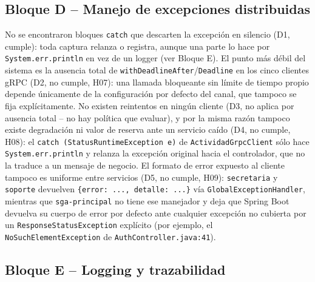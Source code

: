 \documentclass[11pt,a4paper]{article}
\begin{document}
    \subsection{Bloque D -- Manejo de excepciones distribuidas}

    No se encontraron bloques \texttt{catch} que descarten la excepci\'on en silencio (D1, cumple): toda captura relanza o registra, aunque una parte lo hace por \texttt{System.err.println} en vez de un logger (ver Bloque E). El punto m\'as d\'ebil del sistema es la ausencia total de \texttt{withDeadlineAfter}/\texttt{Deadline} en los cinco clientes gRPC (D2, no cumple, H07): una llamada bloqueante sin l\'imite de tiempo propio depende \'unicamente de la configuraci\'on por defecto del canal, que tampoco se fija expl\'icitamente. No existen reintentos en ning\'un cliente (D3, no aplica por ausencia total -- no hay pol\'itica que evaluar), y por la misma raz\'on tampoco existe degradaci\'on ni valor de reserva ante un servicio ca\'ido (D4, no cumple, H08): el \texttt{catch (StatusRuntimeException e)} de \texttt{ActividadGrpcClient} s\'olo hace \texttt{System.err.println} y relanza la excepci\'on original hacia el controlador, que no la traduce a un mensaje de negocio. El formato de error expuesto al cliente tampoco es uniforme entre servicios (D5, no cumple, H09): \texttt{secretaria} y \texttt{soporte} devuelven \texttt{\{\textquotedbl error\textquotedbl: ..., \textquotedbl detalle\textquotedbl: ...\}} v\'ia \texttt{GlobalExceptionHandler}, mientras que \texttt{sga-principal} no tiene ese manejador y deja que Spring Boot devuelva su cuerpo de error por defecto ante cualquier excepci\'on no cubierta por un \texttt{ResponseStatusException} expl\'icito (por ejemplo, el \texttt{NoSuchElementException} de \texttt{AuthController.java:41}).

    \subsection{Bloque E -- Logging y trazabilidad}
\end{document}
